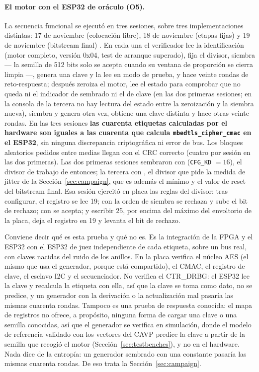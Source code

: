 \paragraph{El motor con el ESP32 de oráculo (O5).} La secuencia
funcional se ejecutó en tres sesiones, sobre tres implementaciones
distintas: 17 de noviembre (colocación libre), 18 de noviembre (etapas
fijas) y 19 de noviembre (bitstream final) \meas{}. En cada una el
verificador lee la identificación (motor completo, versión 0x04, test de
arranque superado), fija el divisor, siembra --- la semilla de 512 bits
solo se acepta cuando su ventana de proporción se cierra limpia ---,
genera una clave y la lee en modo de prueba, y hace veinte rondas de
reto-respuesta; después zeroiza el motor, lee el estado para comprobar
que no queda ni el indicador de sembrado ni el de clave (en las dos
primeras sesiones; en la consola de la tercera no hay lectura del estado
entre la zeroización y la siembra nueva), siembra y genera otra vez,
obtiene una clave distinta y hace otras veinte rondas. En las tres sesiones \textbf{las cuarenta
etiquetas calculadas por el hardware son iguales a las cuarenta que
calcula \texttt{mbedtls\_cipher\_cmac} en el ESP32}, sin ninguna
discrepancia criptográfica ni error de bus. Los bloques aleatorios
pedidos entre medias llegan con el CRC correcto (cuatro por sesión en
las dos primeras). Las dos primeras sesiones sembraron con 
(\texttt{CFG\_KD} $= 16$), el divisor de trabajo de entonces; la tercera
con , el divisor que pide la medida de jitter de la
Sección~\ref{sec:campaign}, que es además el mínimo y el valor de reset
del bitstream final. Esa sesión ejercitó en placa las reglas del
divisor: tras configurar, el registro se lee 19; con  la orden de
siembra se rechaza y sube el bit de rechazo; con  se acepta; y
escribir 25, por encima del máximo del envoltorio de la placa, deja el
registro en 19 y levanta el bit de rechazo.

Conviene decir qué es esta prueba y qué no es. Es la integración de la
\ac{FPGA} y el ESP32 con el ESP32 de juez independiente de cada
etiqueta, sobre un bus real, con claves nacidas del ruido de los
anillos. En la placa verifica el núcleo \ac{AES} (el mismo que usa el
generador, porque está compartido), el \ac{CMAC}, el registro de clave,
el esclavo \ac{I2C} y el secuenciador. No verifica el CTR\_DRBG: el
ESP32 lee la clave y recalcula la etiqueta con ella, así que la clave se
toma como dato, no se predice, y un generador con la derivación o la
actualización mal pasaría las mismas cuarenta rondas. Tampoco es una
prueba de respuesta conocida: el mapa de registros no ofrece, a
propósito, ninguna forma de cargar una clave o una semilla conocidas, así
que el generador se verifica en simulación, donde el modelo de
referencia validado con los vectores del \ac{CAVP} predice la clave a
partir de la semilla que recogió el motor
(Sección~\ref{sec:testbenches}), y no en el hardware. Nada dice de la
entropía: un generador sembrado con una constante pasaría las mismas
cuarenta rondas. De eso trata la Sección~\ref{sec:campaign}.

